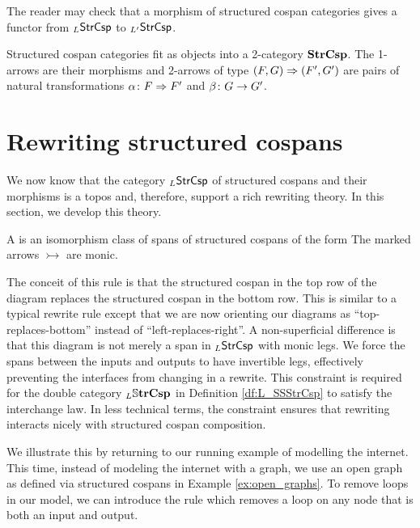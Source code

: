 \documentclass{amsart}
\begin{document}
The reader may check that a morphism of structured cospan
categories gives a functor from $_L\mathsf{StrCsp} $ to
$ _{L'}\mathsf{StrCsp} $. 

Structured cospan categories fit as objects into a
2-category $ \mathbf{StrCsp} $. The 1-arrows are their morphisms
and 2-arrows of type $ (F,G) \Rightarrow (F',G') $ are pairs of
natural transformations $ \alpha \colon F \Rightarrow F' $ and
$ \beta \colon G \to G'$.


\section{Rewriting structured cospans}
\label{sec:RewritingStrCsp}

We now know that the category $ _L\mathsf{StrCsp} $ of
structured cospans and their morphisms is a topos
and, therefore, support a rich rewriting
theory. In this section, we develop this theory.

\begin{definition}
  A  is an
  isomorphism class of spans of structured cospans of the
  form  The marked arrows $ \rightarrowtail $ are
  monic.
\end{definition}

The conceit of this rule is that the structured
cospan in the top row of the diagram replaces the
structured cospan in the bottom row. This is
similar to a typical rewrite rule except that we
are now orienting our diagrams as
``top-replaces-bottom'' instead of
``left-replaces-right''.  A non-superficial
difference is that this diagram is not merely a
span in $ _L\mathsf{StrCsp} $ with monic legs.  We force
the spans between the inputs and outputs to have
invertible legs, effectively preventing the
interfaces from changing in a rewrite.  This
constraint is required for the double category
$ _L\mathbb{S} \mathbf{trCsp} $ in Definition \ref{df:L_SSStrCsp}
to satisfy the interchange law. In less technical
terms, the constraint ensures that rewriting interacts nicely
with structured cospan composition.

\begin{example}
  We illustrate this by returning to our running
  example of modelling the internet. This time,
  instead of modeling the internet with a graph,
  we use an open graph as defined via structured
  cospans in Example \ref{ex:open_graphs}. To
  remove loops in our model, we can introduce the
  rule  which
  removes a loop on any node that is both an input
  and output.
\end{example}
\end{document}
